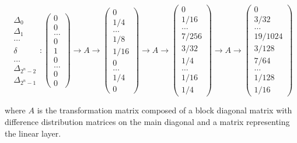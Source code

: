 \documentclass[11pt]{beamer}
\begin{document}
\begin{frame}[allowframebreaks]
\framebreak
\begin{scriptsize}
\begin{equation*}
\begin{array}{c}\Delta_0\\\Delta_1\\ \dots \\ \\ \delta\\ \\ \dots \\ \Delta_{2^n-2} \\ \Delta_{2^n-1}\end{array}:
\left(\begin{array}{c}0\\0\\ \dots\\ 0\\ 1\\ 0\\ \dots \\ 0 \\ 0\end{array}\right) 
\rightarrow A \rightarrow
\left(\begin{array}{c}0\\1/4\\ \dots\\ 1/8\\ 1/16\\ 0\\ \dots \\ 1/4 \\ 0\end{array}\right)
\rightarrow A \rightarrow
\left(\begin{array}{c}0\\1/16\\ \dots\\ 7/256\\ 3/32\\ 1/4\\ \dots \\ 1/16 \\ 1/4\end{array}\right)
\rightarrow A \rightarrow
\left(\begin{array}{c}0\\3/32\\ \dots\\ 19/1024\\ 3/128\\ 7/64\\ \dots \\ 1/128 \\ 1/16\end{array}\right)
 \end{equation*}
\end{scriptsize}

where $A$ is the transformation matrix composed of a block diagonal matrix with difference distribution matrices on the main diagonal and a matrix representing the linear layer.

\end{frame}
\end{document}
